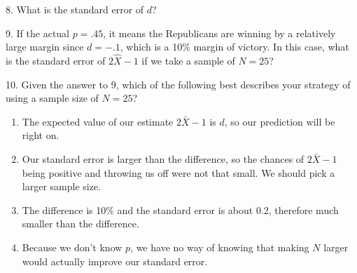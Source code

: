 \documentclass[openany]{book}
\providecommand{\tightlist}{%
  \setlength{\itemsep}{0pt}\setlength{\parskip}{0pt}}
\begin{document}
8. What is the standard error of \(d\)?

9. If the actual \(p=.45\), it means the Republicans are winning by a relatively large margin since \(d= -.1\), which is a 10\% margin of victory. In this case, what is the standard error of \(2\hat{X}-1\) if we take a sample of \(N=25\)?

10. Given the answer to 9, which of the following best describes your strategy of using a sample size of \(N=25\)?

\begin{enumerate}
\def\labelenumi{\alph{enumi}.}
\tightlist
\item
  The expected value of our estimate \(2\bar{X}-1\) is \(d\), so our prediction will be right on.
\item
  Our standard error is larger than the difference, so the chances of \(2\bar{X}-1\) being positive and throwing us off were not that small. We should pick a larger sample size.
\item
  The difference is 10\% and the standard error is about 0.2, therefore much smaller than the difference.
\item
  Because we don't know \(p\), we have no way of knowing that making \(N\) larger would actually improve our standard error.
\end{enumerate}


\end{document}

